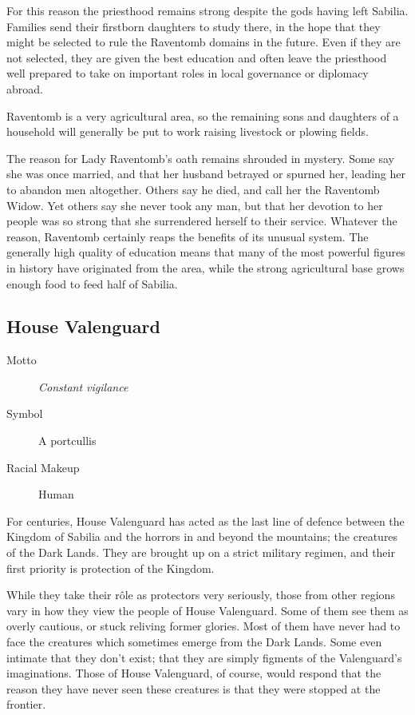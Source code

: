 \documentclass[10pt,twoside,openright,a4paper,twocolumn]{book}
\begin{document}
For this reason the priesthood remains strong despite the gods having left
Sabilia.  Families send their firstborn daughters to study there, in the hope
that they might be selected to rule the Raventomb domains in the future.  Even
if they are not selected, they are given the best education and often leave the
priesthood well prepared to take on important roles in local governance or
diplomacy abroad.

Raventomb is a very agricultural area, so the remaining sons and daughters of a
household will generally be put to work raising livestock or plowing fields.

The reason for Lady Raventomb's oath remains shrouded in mystery.  Some say she
was once married, and that her husband betrayed or spurned her, leading her to
abandon men altogether.  Others say he died, and call her the Raventomb Widow.
Yet others say she never took any man, but that her devotion to her people was
so strong that she surrendered herself to their service.  Whatever the reason,
Raventomb certainly reaps the benefits of its unusual system.  The generally
high quality of education means that many of the most powerful figures in
history have originated from the area, while the strong agricultural base grows
enough food to feed half of Sabilia.

\subsection*{House Valenguard}

\begin{description}
\item[Motto] \textit{Constant vigilance}

\item[Symbol] A portcullis

\item[Racial Makeup] Human
\end{description}

For centuries, House Valenguard has acted as the last line of defence between
the Kingdom of Sabilia and the horrors in and beyond the mountains; the
creatures of the Dark Lands.  They are brought up on a strict military regimen,
and their first priority is protection of the Kingdom.

While they take their rôle as protectors very seriously, those from other
regions vary in how they view the people of House Valenguard.  Some of them see
them as overly cautious, or stuck reliving former glories.  Most of them have
never had to face the creatures which sometimes emerge from the Dark Lands.
Some even intimate that they don't exist; that they are simply figments of the
Valenguard's imaginations.  Those of House Valenguard, of course, would respond
that the reason they have never seen these creatures is that they were stopped
at the frontier.
\end{document}
